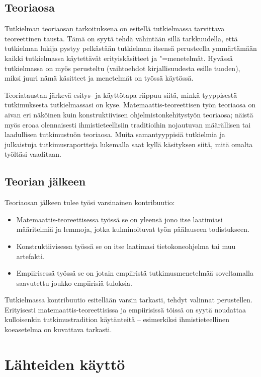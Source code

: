 \documentclass[utf8]{gradu3}
\begin{document}
\section{Teoriaosa}

Tutkielman teoriaosan tarkoituksena on esitellä tutkielmassa
tarvittava teoreettinen tausta.  Tämä on syytä tehdä vähintään sillä
tarkkuudella, että tutkielman lukija pystyy pelkästään tutkielman
itsensä perusteella ymmärtämään kaikki tutkielmassa käytettävät
erityiskäsitteet ja "=menetelmät.  Hyvässä tutkielmassa on myös
perusteltu (vaihtoehdot kirjallisuudesta esille tuoden), miksi juuri
nämä käsitteet ja menetelmät on työssä käytössä.

Teoriataustan järkevä esitys- ja käyttötapa riippuu siitä, minkä
tyyppisestä tutkimuksesta tutkielmassasi on kyse.
Matemaattis-teoreettisen työn teoriaosa on aivan eri näköinen kuin
konstruktiivisen ohjelmistonkehitystyön teoriaosa; näistä myös eroaa
olennaisesti ihmistieteellisiin traditioihin nojautuvan määrällisen
tai laadullisen tutkimustuön teoriaosa.  Muita samantyyppisiä
tutkielmia ja julkaistuja tutkimusraportteja lukemalla saat kyllä
käsityksen siitä, mitä omalta työltäsi vaaditaan.

\section{Teorian jälkeen}

Teoriaosan jälkeen tulee työsi varsinainen kontribuutio:
\begin{itemize}
\item Matemaattis-teoreettisessa työssä se on yleensä jono itse
  laatimiasi määritelmiä ja lemmoja, jotka kulminoituvat työn
  päälauseen todistukseen.
\item Konstruktiivisessa työssä se on itse laatimasi tietokoneohjelma
  tai muu artefakti.
\item Empiirisessä työssä se on jotain empiiristä tutkimusmenetelmää
  soveltamalla saavutettu joukko empiirisiä tuloksia.
\end{itemize}

Tutkielmassa kontribuutio esitellään varsin tarkasti, tehdyt valinnat
perustellen.  Erityisesti matemaattis-teoreettisissa ja empiirisissä
töissä on syytä noudattaa kulloisenkin tutkimustradition käytänteitä
-- esimerkiksi ihmistieteellinen koeasetelma on kuvattava tarkasti.

\chapter{Lähteiden käyttö}
\end{document}
